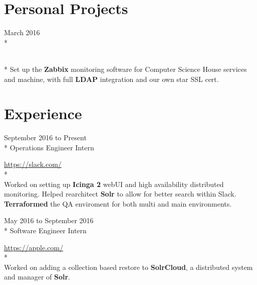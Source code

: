 \documentclass[a4paper,margin,line]{resume}
\newcommand{\rurl}[1]{\hfill {\footnotesize \url{#1}}}
\newcommand{\rdate}[1]{\hfill {\small #1}}
\newcommand{\rproject}[4]{\item[#1] \hfill \rdate{#2} \\* \hfill \rdate{#3} \strut\hfill \rurl{#4} \\*}
\begin{document}
\begin{resume}
\section{\mysidestyle Personal Projects}
    \begin{asparadesc}
        \rproject{Zabbix for Computer Science House}{March 2016}{}{}
        \small
        Set up the {\bf Zabbix} monitoring software for Computer Science House services 
        and machine, with full {\bf LDAP} integration and our own star SSL cert.
        \normalsize
        \\
    \end{asparadesc}

\section{\mysidestyle Experience}
	\begin{asparadesc}
        \rproject{Slack}{September 2016 to Present}{Operations Engineer Intern}{https://slack.com/}
        \\
        \small
        Worked on setting up {\bf Icinga 2} webUI and high availability distributed monitoring. Helped
        rearchitect {\bf Solr} to allow for better search within Slack. {\bf Terraformed} the QA enviroment
        for both multi and main environments.
        \normalsize
        \\

        \rproject{Apple}{May 2016 to September 2016}{Software Engineer Intern}{https://apple.com/}
        \\
        \small
        Worked on adding a collection based restore to {\bf SolrCloud}, a distributed system and manager
        of {\bf Solr}.
        \normalsize
        \\


\end{asparadesc}
\end{resume}
\end{document}
